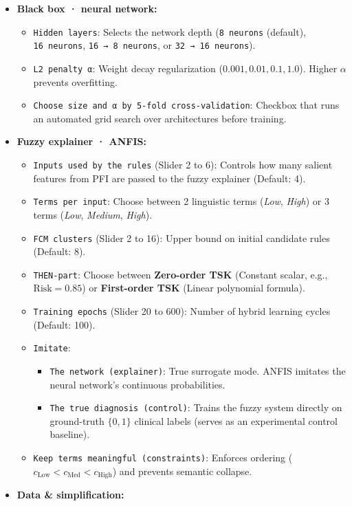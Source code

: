 \begin{itemize}
\tightlist
\item
  \textbf{Black box · neural network:}

  \begin{itemize}
  \tightlist
  \item
    \texttt{Hidden\ layers}: Selects the network depth
    (\texttt{8\ neurons} (default), \texttt{16\ neurons},
    \texttt{16\ →\ 8\ neurons}, or \texttt{32\ →\ 16\ neurons}).
  \item
    \texttt{L2\ penalty\ α}: Weight decay regularization
    (\(0.001, 0.01, 0.1, 1.0\)). Higher \(\alpha\) prevents overfitting.
  \item
    \texttt{Choose\ size\ and\ α\ by\ 5-fold\ cross-validation}:
    Checkbox that runs an automated grid search over architectures
    before training.
  \end{itemize}
\item
  \textbf{Fuzzy explainer · ANFIS:}

  \begin{itemize}
  \tightlist
  \item
    \texttt{Inputs\ used\ by\ the\ rules} (Slider 2 to 6): Controls how
    many salient features from PFI are passed to the fuzzy explainer
    (Default: 4).
  \item
    \texttt{Terms\ per\ input}: Choose between 2 linguistic terms
    (\emph{Low}, \emph{High}) or 3 terms (\emph{Low}, \emph{Medium},
    \emph{High}).
  \item
    \texttt{FCM\ clusters} (Slider 2 to 16): Upper bound on initial
    candidate rules (Default: 8).
  \item
    \texttt{THEN-part}: Choose between \textbf{Zero-order TSK} (Constant
    scalar, e.g., \(\text{Risk} = 0.85\)) or \textbf{First-order TSK}
    (Linear polynomial formula).
  \item
    \texttt{Training\ epochs} (Slider 20 to 600): Number of hybrid
    learning cycles (Default: 100).
  \item
    \texttt{Imitate}:

    \begin{itemize}
    \tightlist
    \item
      \texttt{The\ network\ (explainer)}: True surrogate mode. ANFIS
      imitates the neural network's continuous probabilities.
    \item
      \texttt{The\ true\ diagnosis\ (control)}: Trains the fuzzy system
      directly on ground-truth \(\{0, 1\}\) clinical labels (serves as
      an experimental control baseline).
    \end{itemize}
  \item
    \texttt{Keep\ terms\ meaningful\ (constraints)}: Enforces ordering
    (\(c_{\text{Low}} < c_{\text{Med}} < c_{\text{High}}\)) and prevents
    semantic collapse.
  \end{itemize}
\item
  \textbf{Data \& simplification:}


\end{itemize}
